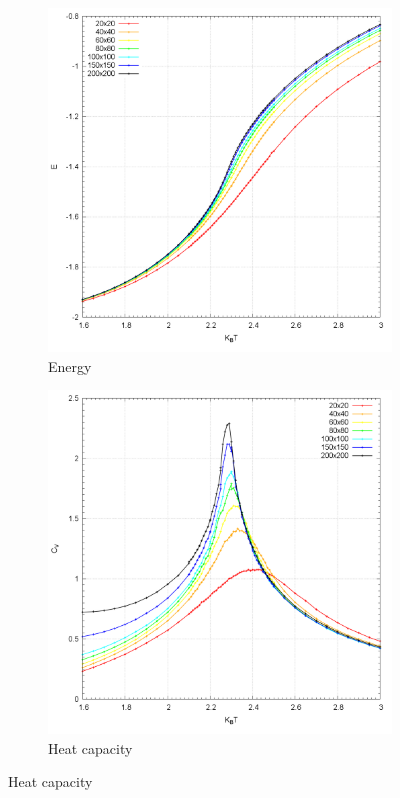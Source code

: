 \documentclass[10pt,a4paper,titlepage]{article}
\begin{document}
\begin{figure}[H]
\centering
\begin{subfigure}{.5\textwidth}
  \centering
  \includegraphics[width=1\linewidth]{Energy}
  \caption{{\footnotesize Energy}}
  \label{fig:sfig1}
\end{subfigure}%
\begin{subfigure}{.5\textwidth}
  \centering
  \includegraphics[width=1\linewidth]{Heat_Capacity}
  \caption{{\footnotesize Heat capacity}}
  \label{fig:sfig2}
\end{subfigure}
\end{figure}
\end{document}
